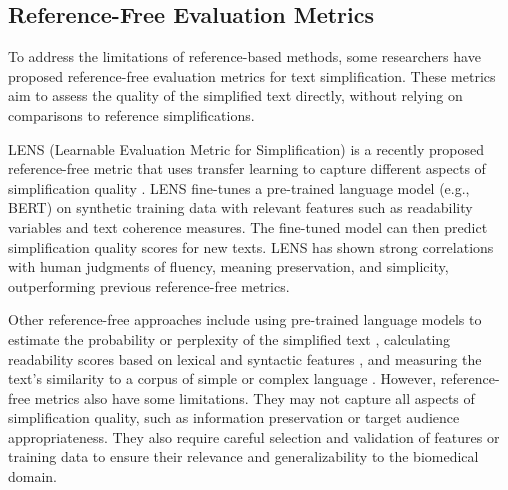 \subsection{Reference-Free Evaluation Metrics}

To address the limitations of reference-based methods, some researchers have proposed reference-free evaluation metrics for text simplification. These metrics aim to assess the quality of the simplified text directly, without relying on comparisons to reference simplifications.

LENS (Learnable Evaluation Metric for Simplification) is a recently proposed reference-free metric that uses transfer learning to capture different aspects of simplification quality \cite{maddela-etal-2023-lens}. LENS fine-tunes a pre-trained language model (e.g., BERT) on synthetic training data with relevant features such as readability variables and text coherence measures. The fine-tuned model can then predict simplification quality scores for new texts. LENS has shown strong correlations with human judgments of fluency, meaning preservation, and simplicity, outperforming previous reference-free metrics.

Other reference-free approaches include using pre-trained language models to estimate the probability or perplexity of the simplified text \cite{ke-etal-2022-ctrleval}, calculating readability scores based on lexical and syntactic features \cite{Truica2023-au}, and measuring the text's similarity to a corpus of simple or complex language \cite{Truica2023-au}.
However, reference-free metrics also have some limitations. They may not capture all aspects of simplification quality, such as information preservation or target audience appropriateness. They also require careful selection and validation of features or training data to ensure their relevance and generalizability to the biomedical domain.